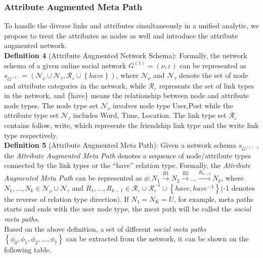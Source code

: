 \documentclass{article}
\begin{document}
\subsubsection{Attribute Augmented Meta Path}
\indent To handle the diverse links
and attributes simultaneously in a unified analytic, we propose to
treat the attributes as nodes as well and introduce the attribute
augmented network.\\
\textbf{Definition 4} (Attribute Augmented Network Schema): Formally, the network schema of a given online social network $G^{(1)} = (\nu, \varepsilon)$ can be represented as $s_{G^{(1)}} = (\mathcal{N}_{\nu}\cup\mathcal{N}_{\tau}, \mathcal{R}_{\varepsilon}\cup \left\{ have \right\})$, where $\mathcal{N}_{\nu}$ and $\mathcal{N}_{\tau}$ denote the set of node and attribute categories in the network, while $\mathcal{R}_{\varepsilon}$ represents the set of link types in the network, and \{have\} means the relationship between node and attribute node types. The node type set $\mathcal{N}_{\nu}$ involves node type {User,Post} while the attribute type set $\mathcal{N}_{\tau}$ includes {Word, Time, Location}. The link type set $\mathcal{R}_{\varepsilon}$ contains {follow, write}, which represents the friendship link type and the write link type respectively.\\
\textbf{Definition 5} (Attribute Augmented Meta Path): Given a network schema $s_{G^{(1)}}$ , the \emph{Attribute Augmented Meta Path} denotes a sequence of  node/attribute types connected by the link types or the “have” relation type. Formally, the \emph{Attribute Augmented Meta Path}
can be represented as $\phi: N_{1} \xrightarrow{R1} N_{2} \xrightarrow{R2} \dots \xrightarrow{R_{k-1}} N_{k}$, where $N_{1},\dots,N_{k} \in \mathcal{N}_{\nu} \cup \mathcal{N}_{\tau}$ and
$R_{1},\dots,R_{k-1} \in \mathcal{R}_{\varepsilon} \cup \mathcal{R}_{\varepsilon}^{-1} \cup \left\{ have, have^{-1}\right\}$(-1 denotes the reverse of relation type direction). If $N_{1}=N_{K}=U$, for example, meta paths starts and ends with the user node type, the meat path will be called the \emph{social meta paths}.\\
\indent Based on the above definition, a set of different \emph{social meta paths} $\left\{ \phi_{0}, \phi_{1}, \phi_{2}, \dots, \phi_{7} \right\}$ can be extracted from the network, it can be shown on the following table.\\
\noindent 
\tiny
\end{document}
